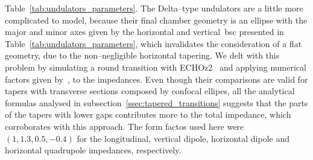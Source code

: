     Table~\ref{tab:undulators_parameters}. The Delta--type undulators are a little more complicated to model, because their final chamber geometry is an ellipse with the major and minor axes given by the horizontal and vertical~\gls{bsc} presented in Table~\ref{tab:undulators_parameters}, which invalidates the consideration of a flat geometry, due to the non--negligible horizontal tapering. We delt with this problem by simulating a round transition with ECHOz2~\cite{Zagorodnov2005} and applying numerical factors given by~, to the impedances. Even though their comparisons are valid for tapers with transverse sections composed by confocal ellipes, all the analytical formulas analysed in
    subsection~\ref{ssec:tapered_transitions} suggests that the parts of the tapers with lower gaps contributes more to the total impedance, which corroborates with this approach. The form factos used here were $(1,1.3,0.5,-0.4)$ for the longitudinal, vertical dipole, horizontal dipole and horizontal quadrupole impedances, respectively.

